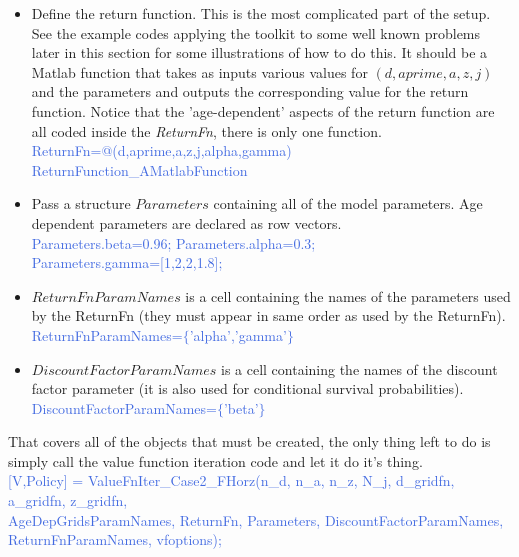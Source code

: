 \begin{itemize}
     \textcolor{RoyalBlue}{AgeDepGridsParamNames.d\_{}grid=\{ \};} \\
      \textcolor{RoyalBlue}{AgeDepGridsParamNames.a\_{}grid=\{'agej','theta','gamma'\};} \\
       \textcolor{RoyalBlue}{AgeDepGridsParamNames.z\_{}grid=\{'agej','theta','sigma','rho'\};} \\
       (In the current example I am imagining that the $d$ variables do not actually depend on age; this would actually mean that the (empty) parameter names for $d\_{}grid$ are unused and you could actually skip declaring them.)
 \item Define the return function. This is the most complicated part of the setup. See the example codes applying the toolkit to some well known problems
     later in this section for some illustrations of how to do this. It should be a Matlab function that takes as inputs various values for $(d,aprime,a,z,j)$
     and the parameters and outputs the corresponding value for the return function. Notice that the 'age-dependent' aspects of the return function are all coded inside the \textit{ReturnFn}, there is only one function. \\
     \textcolor{RoyalBlue}{ReturnFn=@(d,aprime,a,z,j,alpha,gamma) ReturnFunction\_{}AMatlabFunction}
 \item Pass a structure $Parameters$ containing all of the model parameters. Age dependent parameters are declared as row vectors. \\
     \textcolor{RoyalBlue}{Parameters.beta=0.96; Parameters.alpha=0.3;} \\
     \textcolor{RoyalBlue}{Parameters.gamma=[1,2,2,1.8];}
 \item $ReturnFnParamNames$ is a cell containing the names of the parameters used by the ReturnFn (they must appear in same order as used by the ReturnFn). \\
     \textcolor{RoyalBlue}{ReturnFnParamNames=$\{$'alpha','gamma'$\}$}
 \item $DiscountFactorParamNames$ is a cell containing the names of the discount factor parameter (it is also used for conditional survival probabilities). \\
     \textcolor{RoyalBlue}{DiscountFactorParamNames=$\{$'beta'$\}$}
\end{itemize}

That covers all of the objects that must be created, the only thing left to do is simply call the value function iteration code and let it do it's thing. \\
\textcolor{RoyalBlue}{[V,Policy] = ValueFnIter\_{}Case2\_{}FHorz(n\_{}d, n\_{}a, n\_{}z, N\_{}j, d\_{}gridfn, a\_{}gridfn, z\_{}gridfn, } \\
\indent \indent \textcolor{RoyalBlue}{AgeDepGridsParamNames, ReturnFn, Parameters, DiscountFactorParamNames, } \\
\indent \indent \textcolor{RoyalBlue}{ReturnFnParamNames, vfoptions);}

